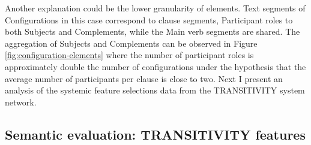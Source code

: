     Another explanation could be the lower granularity of elements. Text segments of Configurations in this case correspond to clause segments, Participant roles to both Subjects and Complements, while the Main verb segments are shared. The aggregation of Subjects and Complements can be observed in Figure \ref{fig:configuration-elements} where the number of participant roles is approximately double the number of configurations under the hypothesis that the average number of participants per clause is close to two. Next I present an analysis of the systemic feature selections data from the TRANSITIVITY system network. 

\subsection{Semantic evaluation: TRANSITIVITY features}
\label{sec:semantic-features}



